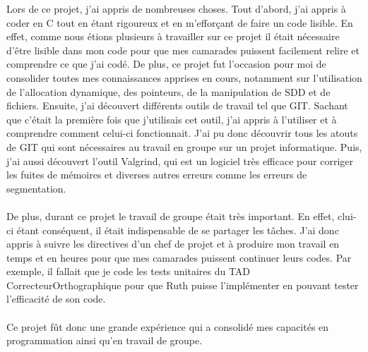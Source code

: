 Lors de ce projet, j'ai appris de nombreuses choses. Tout d'abord, j'ai appris à coder en C tout en étant rigoureux et en m'efforçant de faire un code lisible. En effet, comme nous étions plusieurs à travailler sur ce projet il était nécessaire d'être lisible dans mon code pour que mes camarades puissent facilement relire et comprendre ce que j'ai codé. De plus, ce projet fut l'occasion pour moi de consolider toutes mes connaissances apprises en cours, notamment sur l'utilisation de l'allocation dynamique, des pointeurs, de la manipulation de SDD et de fichiers. Ensuite, j'ai découvert différents outils de travail tel que GIT. Sachant que c'était la première fois que j'utilisais cet outil, j'ai appris à l'utiliser et à comprendre comment celui-ci fonctionnait. J'ai pu donc découvrir tous les atouts de GIT qui sont nécessaires au travail en groupe sur un projet informatique. Puis, j'ai aussi découvert l'outil Valgrind, qui est un logiciel très efficace pour corriger les fuites de mémoires et diverses autres erreurs comme les erreurs de segmentation.\\\\
De plus, durant ce projet le travail de groupe était très important. En effet, clui-ci étant conséquent, il était indispensable de se partager les tâches. J'ai donc appris à suivre les directives d'un chef de projet et à produire mon travail en temps et en heures pour que mes camarades puissent continuer leurs codes. Par exemple, il fallait que je code les tests unitaires du TAD CorrecteurOrthographique pour que Ruth puisse l'implémenter en pouvant tester l'efficacité de son code.\\\\
Ce projet fût donc une grande expérience qui a consolidé mes capacités en programmation ainsi qu'en travail de groupe.
